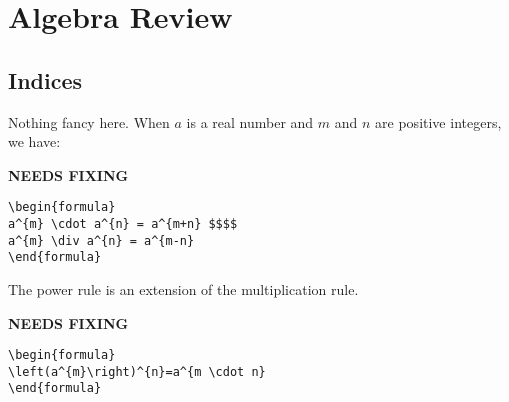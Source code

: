 

\chapter{Algebra Review}

\section {Indices}
Nothing fancy here.
When $a$ is a real number and $m$ and $n$ are positive integers, we have:

{\hfill\Large\bfseries NEEDS FIXING\hfill}
\begin{lstlisting}
\begin{formula}
a^{m} \cdot a^{n} = a^{m+n} $$$$
a^{m} \div a^{n} = a^{m-n}
\end{formula}
 \end{lstlisting} %
The power rule is an extension of the multiplication rule.


{\hfill\Large\bfseries NEEDS FIXING\hfill}
\begin{lstlisting}
\begin{formula}
\left(a^{m}\right)^{n}=a^{m \cdot n}
\end{formula}
 \end{lstlisting}

